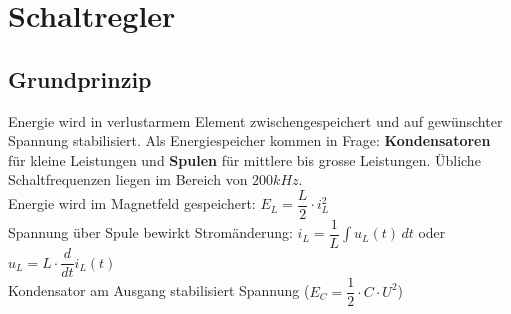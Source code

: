 
\section{Schaltregler}

\subsection{Grundprinzip}
		Energie wird in verlustarmem Element zwischengespeichert und auf gewünschter
		Spannung stabilisiert. Als Energiespeicher kommen in Frage: \textbf{Kondensatoren}
		für kleine Leistungen und \textbf{Spulen} für mittlere bis grosse Leistungen.
		Übliche Schaltfrequenzen liegen im Bereich von $200kHz$. \\
		
		Energie wird im Magnetfeld gespeichert: $E_L = \dfrac{L}{2} \cdot i_L^2$ \\
		Spannung über Spule bewirkt Stromänderung: $i_L = \dfrac{1}{L} \int u_L(t) \, dt$ 
		oder $u_L = L \cdot \dfrac{d}{dt} i_L(t)$\\
		Kondensator am Ausgang stabilisiert Spannung ($E_C = \dfrac{1}{2} \cdot C \cdot U^2$)\\


